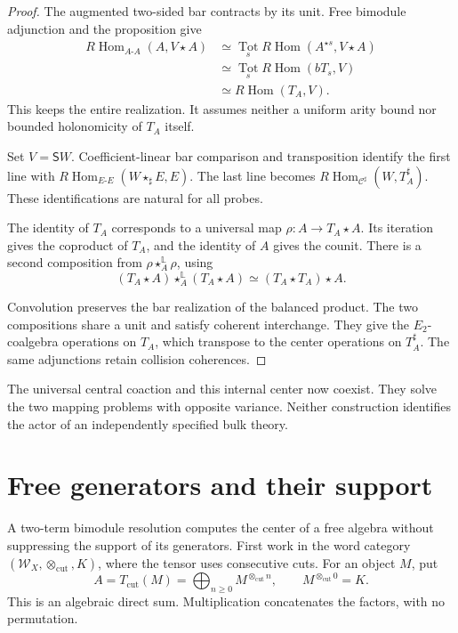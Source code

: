 \begin{proof}
The augmented two-sided bar contracts
by its unit. Free bimodule adjunction
and the proposition give
\[
\begin{split}
 R\operatorname{Hom}_{A\text{-}A}(A,V\star A)
 &\simeq
 \operatorname*{Tot}_s
 R\operatorname{Hom}(A^{\star s},V\star A)\\
 &\simeq
 \operatorname*{Tot}_s
 R\operatorname{Hom}(bT_s,V)\\
 &\simeq R\operatorname{Hom}(T_A,V).
\end{split}
\]
This keeps the entire realization.
It assumes neither a uniform arity
bound nor bounded holonomicity of
$T_A$ itself.

Set $V=\mathsf SW$. Coefficient-linear
bar comparison and transposition
identify the first line with
$R\operatorname{Hom}_{E\text{-}E}
(W\star_\sharp E,E)$.
The last line becomes
$R\operatorname{Hom}_{\mathcal C^\sharp}
(W,T_A^\sharp)$.
These identifications are natural
for all probes.

The identity of $T_A$ corresponds
to a universal map
$\rho:A\to T_A\star A$.
Its iteration gives the coproduct
of $T_A$, and the identity of $A$
gives the counit. There is a second
composition from
$\rho\star_A^{\mathbb L}\rho$, using
\[
 (T_A\star A)\star_A^{\mathbb L}(T_A\star A)
 \simeq(T_A\star T_A)\star A.
\]

Convolution preserves the bar
realization of the balanced product.
The two compositions share a unit
and satisfy coherent interchange.
They give the $E_2$-coalgebra
operations on $T_A$, which transpose
to the center operations on
$T_A^\sharp$. The same adjunctions
retain collision coherences.
\end{proof}

The universal central coaction and
this internal center now coexist.
They solve the two mapping problems
with opposite variance. Neither
construction identifies the actor
of an independently specified
bulk theory.

\section{Free generators and their support}
\label{v4-arith:centers:sec:free}

A two-term bimodule resolution computes the center
of a free algebra without suppressing the support
of its generators. First work in the word category
$(\mathcal W_X,\otimes_{\mathrm{cut}},K)$, where
the tensor uses consecutive cuts. For an object
$M$, put
\[
 A=T_{\mathrm{cut}}(M)
   =\bigoplus_{n\geq0}M^{\otimes_{\mathrm{cut}}n},
 \qquad M^{\otimes_{\mathrm{cut}}0}=K.
\]
This is an algebraic direct sum. Multiplication
concatenates the factors, with no permutation.

